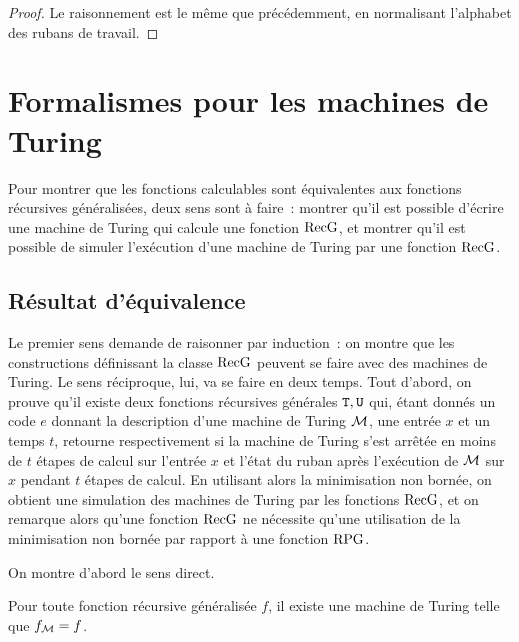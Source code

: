 \begin{proof}
  Le raisonnement est le même que précédemment, en normalisant l'alphabet
  des rubans de travail.
\end{proof}

\section{Formalismes pour les machines de Turing}

Pour montrer que les fonctions calculables sont équivalentes aux fonctions
récursives généralisées, deux sens sont à faire~: montrer qu'il est possible
d'écrire une machine de Turing qui calcule une fonction $\operatorname{RecG}$, et montrer
qu'il est possible de simuler l'exécution d'une machine de Turing par une
fonction $\operatorname{RecG}$.

\subsection{Résultat d'équivalence}

Le premier sens demande de raisonner par induction~: on montre que les
constructions définissant la classe $\operatorname{RecG}$ peuvent se faire avec des machines
de Turing. Le sens réciproque, lui, va se faire en deux temps. Tout d'abord, on
prouve qu'il existe deux fonctions récursives générales ${\normalfont\texttt{T}},{\normalfont\texttt{U}}$ qui, étant
donnés un code $e$ donnant la description d'une machine de Turing $\mathcal{M}$, une
entrée $x$ et un temps $t$, retourne respectivement si la machine de Turing
s'est arrêtée en moins de $t$ étapes de calcul sur l'entrée $x$ et l'état du
ruban après l'exécution de $\mathcal{M}$ sur $x$ pendant $t$ étapes de calcul. En
utilisant alors la minimisation non bornée, on obtient une simulation des
machines de Turing par les fonctions $\operatorname{RecG}$, et on remarque alors qu'une
fonction $\operatorname{RecG}$ ne nécessite qu'une utilisation de la minimisation non bornée
par rapport à une fonction $\operatorname{RPG}$.

On montre d'abord le sens direct.

\begin{lemma}\label{lem.recG.MT}
  Pour toute fonction récursive généralisée $f$, il existe une machine de
  Turing telle que $f_{\mathcal{M}} = f$.
\end{lemma}

